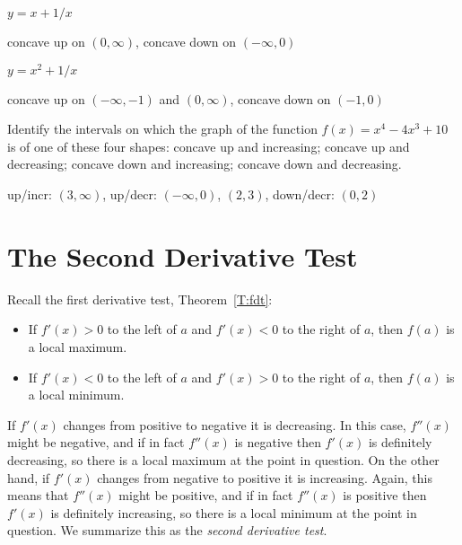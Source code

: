 \begin{exercises}
\begin{exercise} $y = x+ 1/x$
\begin{answer} concave up on $(0,\infty)$, concave down on $(-\infty,0)$
\end{answer}\end{exercise}

\begin{exercise} $y = x^2+ 1/x$
\begin{answer} concave up on $(-\infty,-1)$ and $(0,\infty)$, concave down on $(-1,0)$
\end{answer}\end{exercise}

\endtwocol

\begin{exercise} Identify the intervals on which the graph of the
  function $f(x) = x^4-4x^3 +10$ is of one of these four shapes:
  concave up and increasing; concave up and decreasing; concave down
  and increasing; concave down and decreasing.
\begin{answer} up/incr: $(3,\infty)$, up/decr: $(-\infty,0)$, $(2,3)$,
down/decr: $(0,2)$
\end{answer}\end{exercise}


\end{exercises}








\section{The Second Derivative Test}


Recall the first derivative test, Theorem~\ref{T:fdt}:
\begin{itemize}
\item If $f'(x)>0$ to the left of $a$ and $f'(x)<0$ to the right of
  $a$, then $f(a)$ is a local maximum.
\item If $f'(x)<0$ to the left of $a$ and $f'(x)>0$ to the right of
  $a$, then $f(a)$ is a local minimum.
\end{itemize}

If $f'(x)$ changes from positive to negative it is decreasing. In this
case, $f''(x)$ might be negative, and if in fact $f''(x)$ is negative
then $f'(x)$ is definitely decreasing, so there is a local maximum at
the point in question. On the other hand, if $f'(x)$ changes from
negative to positive it is increasing. Again, this means that
$f''(x)$ might be positive, and if in fact $f''(x)$ is positive then
$f'(x)$ is definitely increasing, so there is a local minimum at the
point in question. We summarize this as the \textit{second derivative
  test}.

